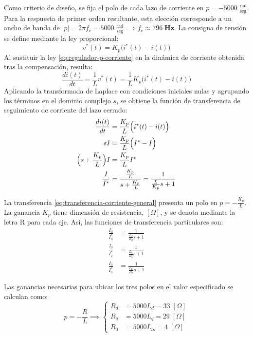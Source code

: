 \documentclass[blue,fullpaper]{ludusofficial}  %
\begin{document}
Como criterio de diseño, se fija el polo de cada lazo de corriente en $p=-5000\;\frac{\text{rad}}{\text{seg}}$. Para la respuesta de primer orden resultante, esta elección corresponde a un ancho de banda de $|p|=2\pi f_c=5000\;\frac{\text{rad}}{\text{seg}} \implies f_c \approx 796\; \textbf{Hz}$. La consigna de tensión se define mediante la ley proporcional:
\begin{equation}
\label{eq:regulador-p-corriente}
v^{*}(t) = K_{p} \Big( i^{*}(t) -i(t) \Big)
\end{equation}
Al sustituir la ley \eqref{eq:regulador-p-corriente} en la dinámica de corriente obtenida tras la compensación, resulta:
\[
\frac{di(t)}{dt} = \frac{1}{L} v^{*}(t) =  \frac{1}{L} K_{p} \Big( i^{*}(t) -i(t) \Big)
\]
Aplicando la transformada de Laplace con condiciones iniciales nulas y agrupando los términos en el dominio complejo $s$, se obtiene la función de transferencia de seguimiento de corriente del lazo cerrado:
\begin{align}
\frac{di(t)}{dt}  & = \frac{K_{p}}{L}  \Big( i^{*}(t) -i(t) \Big)
\notag \\
sI & = \frac{K_{p}}{L} \Big( I^{*} - I \Big)
\notag \\
\Big( s + \frac{K_{p}}{L} \Big) I & = \frac{K_{p}}{L} I^{*}
\notag \\
\frac{I}{I^{*}} & = \frac{\frac{K_{p}}{L}}{s+\frac{K_{p}}{L}}=\frac{1}{\frac{L}{K_{p}}s+1}
\label{eq:transferencia-corriente-general}
\end{align}

La transferencia \eqref{eq:transferencia-corriente-general} presenta un polo en $p=-\frac{K_{p}}{L}$. La ganancia $K_p$ tiene dimensión de resistencia, $[\Omega]$, y se denota mediante la letra R para cada eje. Así, las funciones de transferencia particulares son:
\begin{align}
\frac{I_{d}}{I_{d}^{*}} & = \frac{1}{\frac{L_d}{R_{d}}s+1}
\label{eq:transferencia-corriente-d} \\
\frac{I_{q}}{I_{q}^{*}} & = \frac{1}{\frac{L_q}{R_{q}}s+1}
\label{eq:transferencia-corriente-q} \\
\frac{I_{0}}{I_{0}^{*}} & = \frac{1}{\frac{L_{ls}}{R_{0}}s+1}
\label{eq:transferencia-corriente-cero}
\end{align}

Las ganancias necesarias para ubicar los tres polos en el valor especificado se calculan como:
\begin{equation}
\label{eq:ganancias-corriente}
p = -\frac{R}{L} \implies \begin{cases}
R_{d} & = 5000 L_{d} = 33\; [\Omega] \\
R_{q} & = 5000 L_{q} = 29\; [\Omega]\\
R_{0} & = 5000 L_{ls} = 4\; [\Omega]
\end{cases}
\end{equation}
\end{document}
